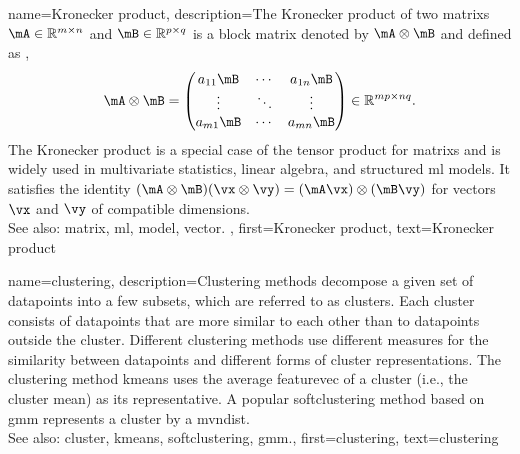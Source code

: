 {name={Kronecker product}, 
	description={The Kronecker product  of two \glspl{matrix} $\mA \in \mathbb{R}^{m \times n}$ 
		and $\mB \in \mathbb{R}^{p \times q}$ is a block \gls{matrix} denoted by $\mA \otimes \mB$ 
	 	and defined as \cite{GolubVanLoanBook}, \cite{HornMatAnalysis}
    		\[
      		\mA \otimes \mB =
      		\begin{pmatrix}
        		a_{11}\mB & \cdots & a_{1n}\mB \\
        		\vdots & \ddots & \vdots \\
        		a_{m1}\mB & \cdots & a_{mn}\mB
      		\end{pmatrix}
      		\in \mathbb{R}^{mp \times nq}.
    		\]
    		The Kronecker product is a special case of the tensor product for \glspl{matrix} and is 
		widely used in multivariate statistics, linear algebra, and structured \gls{ml} \glspl{model}. 
		It satisfies the identity $(\mA \otimes \mB)(\vx \otimes \vy) = (\mA\vx) \otimes (\mB\vy)$ 
		for \glspl{vector} $\vx$ and $\vy$ of compatible dimensions.
		\\
		See also: \gls{matrix}, \gls{ml}, \gls{model}, \gls{vector}. },
	first={Kronecker product},
	text={Kronecker product} 
}
	
{name={clustering}, 
	description={Clustering methods decompose a given 
		set of \glspl{datapoint} into a few subsets, which are referred to as \glspl{cluster}. 
		Each \gls{cluster} consists of \glspl{datapoint} that are more similar to each 
		other than to \glspl{datapoint} outside the \gls{cluster}. Different clustering methods 
		use different measures for the similarity between \glspl{datapoint} and different 
		forms of \gls{cluster} representations. The clustering method \gls{kmeans} uses the 
		average \gls{featurevec} of a \gls{cluster} (i.e., the \gls{cluster} \gls{mean}) as its representative. 
		A popular \gls{softclustering} method based on \gls{gmm} represents 
		a \gls{cluster} by a \gls{mvndist}.
				\\
		See also: \gls{cluster}, \gls{kmeans}, \gls{softclustering}, \gls{gmm}.},
	first={clustering},
	text={clustering} 
}
	
